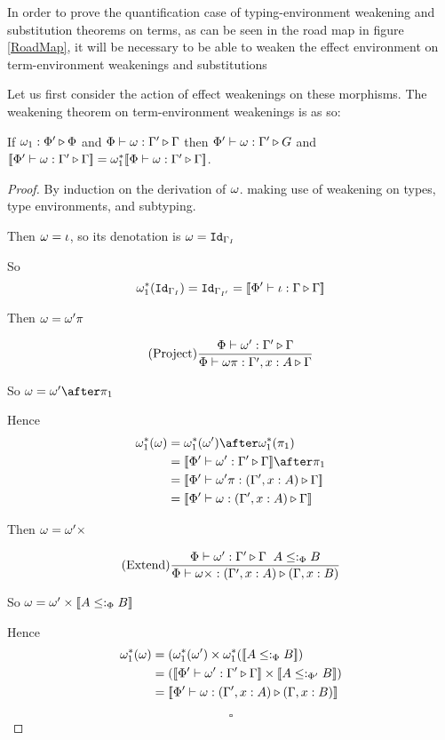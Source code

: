 \documentclass{Report}
\begin{document}
In order to prove the quantification case of typing-environment weakening and substitution theorems on terms, as can be seen in the road map in figure \ref{RoadMap}, it will be necessary to be able to weaken the effect environment on term-environment weakenings and substitutions

Let us first consider the action of effect weakenings on these morphisms. The weakening theorem on term-environment weakenings is as so:


\begin{theorem}
    If $\omega_1 : \Phi' \triangleright \Phi$ and $\Phi\vdash \omega : \Gamma' \triangleright \Gamma$ then $\Phi'\vdash \omega : \Gamma' \triangleright G$ and ${\bf [\![}\Phi'\vdash \omega : \Gamma' \triangleright \Gamma{\bf ]\!]} = \omega_1^*{\bf [\![}\Phi\vdash \omega : \Gamma' \triangleright \Gamma{\bf ]\!]}$.
\end{theorem}

\begin{proof}
    By induction on the derivation of $\omega$. making use of weakening on types, type environments, and subtyping.

    Then $\omega = \iota$, so its denotation is $\omega = \texttt{Id}_{\Gamma_I}$
    
    So
    \begin{equation}
      \omega_1^*(\texttt{Id}_{\Gamma_I}) = \texttt{Id}_{\Gamma_{I'}} = {\bf [\![}\Phi'\vdash \iota : \Gamma \triangleright \Gamma{\bf ]\!]}  
    \end{equation}
    
    Then $\omega = \omega'\pi$
    
    \begin{equation}
        (\text{Project}) \frac{\Phi\vdash \omega' : \Gamma' \triangleright \Gamma}{\Phi\vdash \omega\pi : \Gamma',x:A \triangleright \Gamma}
    \end{equation}
    
    So $\w = \w'\after\p$
    
    Hence
    \begin{align}
        \w_1\star(\w) &= \w_1\star(\w')\after\w_1\star(\p)\\
        & = \deno{\ewrel{\P'}{\w'}{\G'}{\G}}\after\p\\
        & = \deno{\ewrel{\P'}{\w'\pi}{(\G',x:A)}{\G}}\\
        & = \deno{\ewrel{\P'}{\w}{(\G', x:A)}{\G}}
    \end{align}
    
    Then $\omega = \omega'\times$
    
    \begin{equation}
        (\text{Extend}) \frac{\Phi\vdash \omega' : \Gamma' \triangleright \Gamma\;\; A\leq:_\Phi B}{\Phi\vdash \omega\times : (\Gamma',x:A) \triangleright (\Gamma, x:B)}
    \end{equation}
    
    So $\omega = \omega'\times{\bf [\![}A\leq:_\Phi B{\bf ]\!]}$
    
    Hence
    \begin{align}
        \w_1\star(\w) &=(\w_1\star(\w')\times\w_1\star(\deno{A\subtypep B})\\
        & = (\deno{\ewrel{\P'}{\w'}{\G'}{\G}}\times\deno{A\subtypepp B})\\
        & = \deno{\ewrel{\P'}{\w}{(\G',x:A)}{(\G,x:B)}}
    \end{align}

    $$\square$$
\end{proof}
\end{document}
